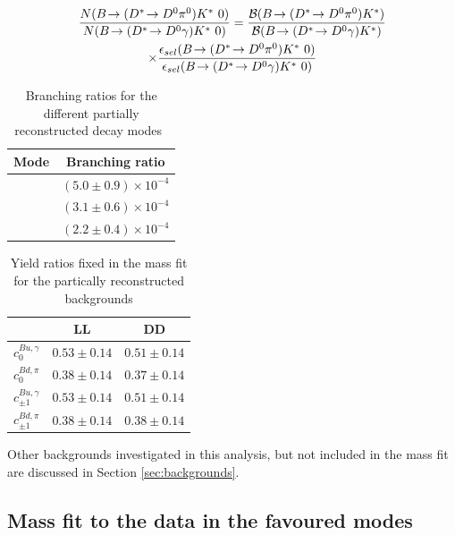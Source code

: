 \begin{multline}
\frac{N(\decay{\B}{(\decay{\Dstar}{\Dz\piz})\Kstar}\ 0)}{N(\decay{\B}{(\decay{\Dstar}{\Dz\gamma})\Kstar}\ 0)} = \frac{\mathcal{B}(\decay{\B}{(\decay{\Dstar}{\Dz\piz})\Kstar})}{\mathcal{B}(\decay{\B}{(\decay{\Dstar}{\Dz\gamma})\Kstar})} \\
\times \frac{\epsilon_{sel}(\decay{\B}{(\decay{\Dstar}{\Dz\piz})\Kstar}\ 0)}{\epsilon_{sel}(\decay{\B}{(\decay{\Dstar}{\Dz\gamma})\Kstar}\ 0)}
\label{partrecoexample}
\end{multline}

\begin{table}[h]
\centering
\begin{tabular}{c|c}
Mode & Branching ratio \\
\hline
\decay{\Bm}{(\decay{\Dstarz}{\Dz[\piz]})\Kstarm} & $(5.0 \pm 0.9) \times 10^{-4}$ \\
\decay{\Bm}{(\decay{\Dstarz}{\Dz[\gamma]})\Kstarm} & $(3.1 \pm 0.6) \times 10^{-4}$ \\
\decay{\Bd}{(\decay{\Dstarp}{\Dz[\pip]})\Kstarm} & $(2.2 \pm 0.4) \times 10^{-4}$ \\
\end{tabular}
\caption{Branching ratios for the different partially reconstructed decay modes~\cite{PDG2014}}
\label{partrecoBRs}
\end{table}

\begin{table}[h]
\centering
\begin{tabular}{ccc}
\hline
& LL & DD \\
\hline
$c^{Bu,\gamma}_0$ & $0.53 \pm 0.14$ & $0.51 \pm 0.14$ \\[3mm]
$c^{Bd,\pi}_0$ & $0.38 \pm 0.14$ & $0.37 \pm 0.14$ \\[3mm]
$c^{Bu,\gamma}_{\pm 1}$ & $0.53 \pm 0.14$ & $0.51 \pm 0.14$ \\[3mm]
$c^{Bd,\pi}_{\pm 1}$ & $0.38 \pm 0.14$ & $0.38 \pm 0.14$ \\[3mm]
\hline
\end{tabular}
\caption{Yield ratios fixed in the mass fit for the partically reconstructed backgrounds}
\label{fixedyieldratios}
\end{table}

Other backgrounds investigated in this analysis, but not included in the mass fit are discussed in Section \ref{sec:backgrounds}.


\subsection{Mass fit to the data in the favoured modes}
\label{sec:massfit:fit}

